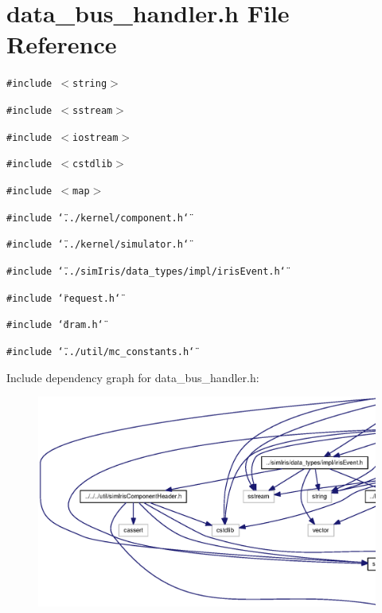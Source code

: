 \section{data\_\-bus\_\-handler.h File Reference}
\label{data__bus__handler_8h}
{\tt \#include $<$string$>$}\par
{\tt \#include $<$sstream$>$}\par
{\tt \#include $<$iostream$>$}\par
{\tt \#include $<$cstdlib$>$}\par
{\tt \#include $<$map$>$}\par
{\tt \#include \char`\"{}../kernel/component.h\char`\"{}}\par
{\tt \#include \char`\"{}../kernel/simulator.h\char`\"{}}\par
{\tt \#include \char`\"{}../simIris/data\_\-types/impl/irisEvent.h\char`\"{}}\par
{\tt \#include \char`\"{}request.h\char`\"{}}\par
{\tt \#include \char`\"{}dram.h\char`\"{}}\par
{\tt \#include \char`\"{}../util/mc\_\-constants.h\char`\"{}}\par


Include dependency graph for data\_\-bus\_\-handler.h:\nopagebreak
\begin{figure}[H]
\begin{center}
\leavevmode
\includegraphics[width=420pt]{data__bus__handler_8h__incl}
\end{center}
\end{figure}


